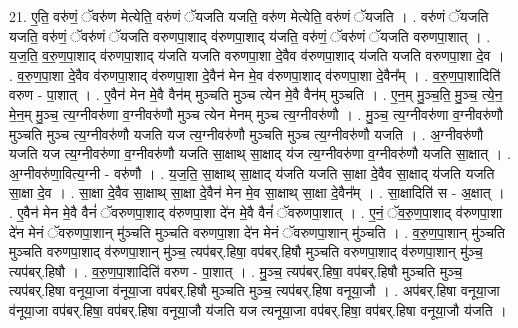 \documentclass[17pt]{extarticle}
\begin{document}
21. ए॒ति॒ वरु॑णं॒ ॅवरु॑ण मेत्येति॒ वरु॑णं ॅयजति यजति॒ वरु॑ण मेत्येति॒ वरु॑णं ॅयजति । . वरु॑णं ॅयजति यजति॒ वरु॑णं॒ ॅवरु॑णं ॅयजति वरुणपा॒शाद् व॑रुणपा॒शाद् य॑जति॒ वरु॑णं॒ ॅवरु॑णं ॅयजति वरुणपा॒शात् । . य॒ज॒ति॒ व॒रु॒ण॒पा॒शाद् व॑रुणपा॒शाद् य॑जति यजति वरुणपा॒शा दे॒वैव व॑रुणपा॒शाद् य॑जति यजति वरुणपा॒शा दे॒व । . व॒रु॒ण॒पा॒शा दे॒वैव व॑रुणपा॒शाद् व॑रुणपा॒शा दे॒वैन॑ मेन मे॒व व॑रुणपा॒शाद् व॑रुणपा॒शा दे॒वैन᳚म् । . व॒रु॒ण॒पा॒शादिति॑ वरुण - पा॒शात् । . ए॒वैन॑ मेन मे॒वै वैन॑म् मुञ्चति मुञ्च त्येन मे॒वै वैन॑म् मुञ्चति । . ए॒न॒म् मु॒ञ्च॒ति॒ मु॒ञ्च॒ त्ये॒न॒ मे॒न॒म् मु॒ञ्च॒ त्य॒ग्नीवरु॑णा व॒ग्नीवरु॑णौ मुञ्च त्येन मेनम् मुञ्च त्य॒ग्नीवरु॑णौ । . मु॒ञ्च॒ त्य॒ग्नीवरु॑णा व॒ग्नीवरु॑णौ मुञ्चति मुञ्च त्य॒ग्नीवरु॑णौ यजति यज त्य॒ग्नीवरु॑णौ मुञ्चति मुञ्च त्य॒ग्नीवरु॑णौ यजति । . अ॒ग्नीवरु॑णौ यजति यज त्य॒ग्नीवरु॑णा व॒ग्नीवरु॑णौ यजति सा॒क्षाथ् सा॒क्षाद् य॑ज त्य॒ग्नीवरु॑णा व॒ग्नीवरु॑णौ यजति सा॒क्षात् । . अ॒ग्नीवरु॑णा॒वित्य॒ग्नी - वरु॑णौ । . य॒ज॒ति॒ सा॒क्षाथ् सा॒क्षाद् य॑जति यजति सा॒क्षा दे॒वैव सा॒क्षाद् य॑जति यजति सा॒क्षा दे॒व । . सा॒क्षा दे॒वैव सा॒क्षाथ् सा॒क्षा दे॒वैन॑ मेन मे॒व सा॒क्षाथ् सा॒क्षा दे॒वैन᳚म् । . सा॒क्षादिति॑ स - अ॒क्षात् । . ए॒वैन॑ मेन मे॒वै वैनं॑ ॅवरुणपा॒शाद् व॑रुणपा॒शा दे॑न मे॒वै वैनं॑ ॅवरुणपा॒शात् । . ए॒नं॒ ॅव॒रु॒ण॒पा॒शाद् व॑रुणपा॒शा दे॑न मेनं ॅवरुणपा॒शान् मु॑ञ्चति मुञ्चति वरुणपा॒शा दे॑न मेनं ॅवरुणपा॒शान् मु॑ञ्चति । . व॒रु॒ण॒पा॒शान् मु॑ञ्चति मुञ्चति वरुणपा॒शाद् व॑रुणपा॒शान् मु॑ञ्च॒ त्यप॑बर्.हिषा॒ वप॑बर्.हिषौ मुञ्चति वरुणपा॒शाद् व॑रुणपा॒शान् मु॑ञ्च॒ त्यप॑बर्.हिषौ । . व॒रु॒ण॒पा॒शादिति॑ वरुण - पा॒शात् । . मु॒ञ्च॒ त्यप॑बर्.हिषा॒ वप॑बर्.हिषौ मुञ्चति मुञ्च॒ त्यप॑बर्.हिषा वनूया॒जा व॑नूया॒जा वप॑बर्.हिषौ मुञ्चति मुञ्च॒ त्यप॑बर्.हिषा वनूया॒जौ । . अप॑बर्.हिषा वनूया॒जा व॑नूया॒जा वप॑बर्.हिषा॒ वप॑बर्.हिषा वनूया॒जौ य॑जति यज त्यनूया॒जा वप॑बर्.हिषा॒ वप॑बर्.हिषा वनूया॒जौ य॑जति । \newline
\end{document}
